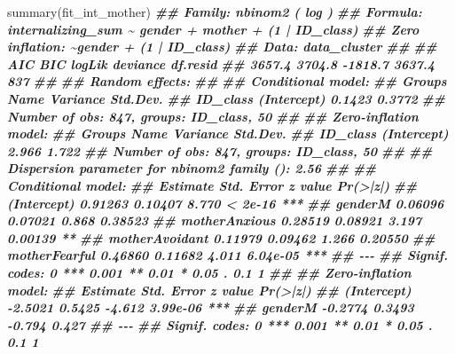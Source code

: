 \documentclass[
]{book}
\newenvironment{Shaded}{\begin{snugshade}}{\end{snugshade}}
\newcommand{\DocumentationTok}[1]{\textcolor[rgb]{0.56,0.35,0.01}{\textbf{\textit{#1}}}}
\newcommand{\FunctionTok}[1]{\textcolor[rgb]{0.00,0.00,0.00}{#1}}
\newcommand{\NormalTok}[1]{#1}
\begin{document}
\begin{Shaded}
\begin{Highlighting}[]
\FunctionTok{summary}\NormalTok{(fit\_int\_mother)}
\DocumentationTok{\#\#  Family: nbinom2  ( log )}
\DocumentationTok{\#\# Formula:          internalizing\_sum \textasciitilde{} gender + mother + (1 | ID\_class)}
\DocumentationTok{\#\# Zero inflation:                     \textasciitilde{}gender + (1 | ID\_class)}
\DocumentationTok{\#\# Data: data\_cluster}
\DocumentationTok{\#\# }
\DocumentationTok{\#\#      AIC      BIC   logLik deviance df.resid }
\DocumentationTok{\#\#   3657.4   3704.8  {-}1818.7   3637.4      837 }
\DocumentationTok{\#\# }
\DocumentationTok{\#\# Random effects:}
\DocumentationTok{\#\# }
\DocumentationTok{\#\# Conditional model:}
\DocumentationTok{\#\#  Groups   Name        Variance Std.Dev.}
\DocumentationTok{\#\#  ID\_class (Intercept) 0.1423   0.3772  }
\DocumentationTok{\#\# Number of obs: 847, groups:  ID\_class, 50}
\DocumentationTok{\#\# }
\DocumentationTok{\#\# Zero{-}inflation model:}
\DocumentationTok{\#\#  Groups   Name        Variance Std.Dev.}
\DocumentationTok{\#\#  ID\_class (Intercept) 2.966    1.722   }
\DocumentationTok{\#\# Number of obs: 847, groups:  ID\_class, 50}
\DocumentationTok{\#\# }
\DocumentationTok{\#\# Dispersion parameter for nbinom2 family (): 2.56 }
\DocumentationTok{\#\# }
\DocumentationTok{\#\# Conditional model:}
\DocumentationTok{\#\#                Estimate Std. Error z value Pr(\textgreater{}|z|)    }
\DocumentationTok{\#\# (Intercept)     0.91263    0.10407   8.770  \textless{} 2e{-}16 ***}
\DocumentationTok{\#\# genderM         0.06096    0.07021   0.868  0.38523    }
\DocumentationTok{\#\# motherAnxious   0.28519    0.08921   3.197  0.00139 ** }
\DocumentationTok{\#\# motherAvoidant  0.11979    0.09462   1.266  0.20550    }
\DocumentationTok{\#\# motherFearful   0.46860    0.11682   4.011 6.04e{-}05 ***}
\DocumentationTok{\#\# {-}{-}{-}}
\DocumentationTok{\#\# Signif. codes:  0 \textquotesingle{}***\textquotesingle{} 0.001 \textquotesingle{}**\textquotesingle{} 0.01 \textquotesingle{}*\textquotesingle{} 0.05 \textquotesingle{}.\textquotesingle{} 0.1 \textquotesingle{} \textquotesingle{} 1}
\DocumentationTok{\#\# }
\DocumentationTok{\#\# Zero{-}inflation model:}
\DocumentationTok{\#\#             Estimate Std. Error z value Pr(\textgreater{}|z|)    }
\DocumentationTok{\#\# (Intercept)  {-}2.5021     0.5425  {-}4.612 3.99e{-}06 ***}
\DocumentationTok{\#\# genderM      {-}0.2774     0.3493  {-}0.794    0.427    }
\DocumentationTok{\#\# {-}{-}{-}}
\DocumentationTok{\#\# Signif. codes:  0 \textquotesingle{}***\textquotesingle{} 0.001 \textquotesingle{}**\textquotesingle{} 0.01 \textquotesingle{}*\textquotesingle{} 0.05 \textquotesingle{}.\textquotesingle{} 0.1 \textquotesingle{} \textquotesingle{} 1}
\end{Highlighting}
\end{Shaded}
\end{document}
